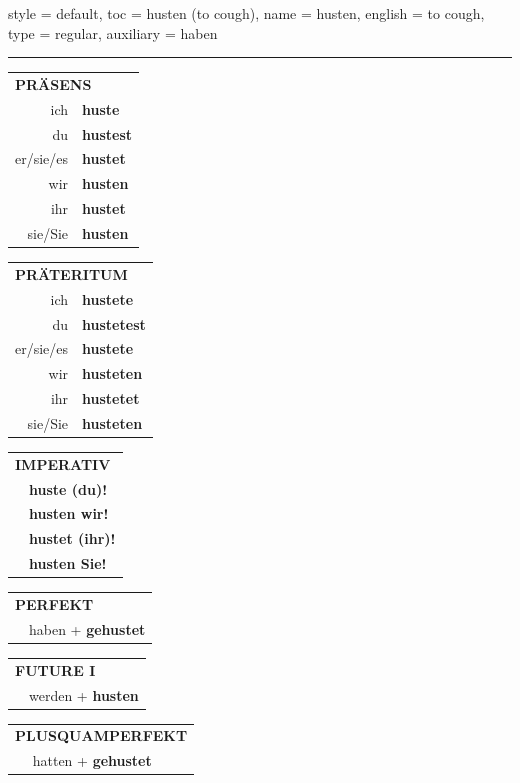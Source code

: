 \begin{verbentry}{
  style = {default},
  toc = {husten (to cough)},
  name = {husten},
  english = {to cough},
  type = {regular},
  auxiliary = {haben}
}


\vspace{5pt}
\hrule
\vspace{5pt}

\begin{tabular}{rl}
\multicolumn{2}{l}{\textbf{PRÄSENS}}\\
ich & \textbf{huste}\\
du & \textbf{hustest}\\
er/sie/es & \textbf{hustet}\\
wir & \textbf{husten}\\
ihr & \textbf{hustet}\\
sie/Sie & \textbf{husten}\\
\end{tabular}
\hfill
\begin{tabular}{rl}
\multicolumn{2}{l}{\textbf{PRÄTERITUM}}\\
ich & \textbf{hustete}\\
du & \textbf{hustetest}\\
er/sie/es & \textbf{hustete}\\
wir & \textbf{husteten}\\
ihr & \textbf{hustetet}\\
sie/Sie & \textbf{husteten}\\
\end{tabular}
\hfill
\begin{tabular}{rl}
\multicolumn{2}{l}{\textbf{IMPERATIV}}\\
& \textbf{huste (du)!}\\
& \textbf{husten wir!}\\
& \textbf{hustet (ihr)!}\\
& \textbf{husten Sie!}\\
\end{tabular}

\vspace{10pt}

\begin{tabular}{rl}
\multicolumn{2}{l}{\textbf{PERFEKT}}\\
& haben + \textbf{gehustet}\\
\end{tabular}
\hfill
\begin{tabular}{rl}
\multicolumn{2}{l}{\textbf{FUTURE I}}\\
& werden + \textbf{husten}\\
\end{tabular}
\hfill
\begin{tabular}{rl}
\multicolumn{2}{l}{\textbf{PLUSQUAMPERFEKT}}\\
& hatten + \textbf{gehustet}\\
\end{tabular}


\end{verbentry}
